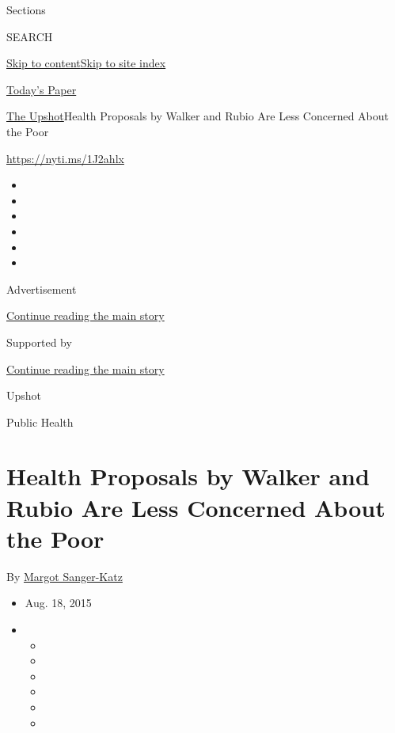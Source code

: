 Sections

SEARCH

\protect\hyperlink{site-content}{Skip to
content}\protect\hyperlink{site-index}{Skip to site index}

\href{https://myaccount.nytimes.com/auth/login?response_type=cookie\&client_id=vi}{}

\href{https://www.nytimes.com/section/todayspaper}{Today's Paper}

\href{/section/upshot}{The Upshot}\textbar{}Health Proposals by Walker
and Rubio Are Less Concerned About the Poor

\url{https://nyti.ms/1J2ahlx}

\begin{itemize}
\item
\item
\item
\item
\item
\item
\end{itemize}

Advertisement

\protect\hyperlink{after-top}{Continue reading the main story}

Supported by

\protect\hyperlink{after-sponsor}{Continue reading the main story}

Upshot

Public Health

\hypertarget{health-proposals-by-walker-and-rubio-are-less-concerned-about-the-poor}{%
\section{Health Proposals by Walker and Rubio Are Less Concerned About
the
Poor}\label{health-proposals-by-walker-and-rubio-are-less-concerned-about-the-poor}}

By \href{http://www.nytimes.com/by/margot-sanger-katz}{Margot
Sanger-Katz}

\begin{itemize}
\item
  Aug. 18, 2015
\item
  \begin{itemize}
  \item
  \item
  \item
  \item
  \item
  \item
  \end{itemize}
\end{itemize}

